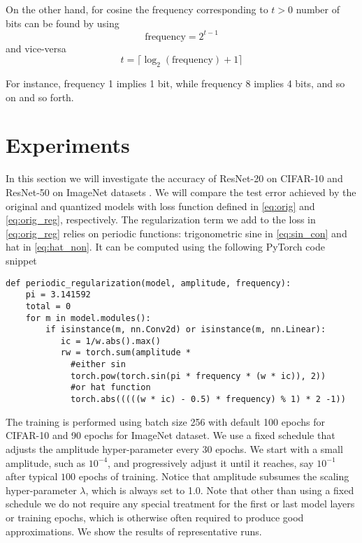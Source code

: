 \documentclass{article}
\begin{document}
On the other hand, for cosine the frequency corresponding to $t>0$ number of bits can be found by using
\begin{equation}
\text{frequency} =  2^{t-1}
\end{equation}
and vice-versa
\begin{equation}
t = \lceil \log_2 (\text{frequency}) + 1 \rceil
\end{equation}

For instance, frequency 1 implies 1 bit, while frequency 8 implies 4 bits, and so on and so forth.


\section{Experiments}

In this section we will investigate the accuracy of ResNet-20 on CIFAR-10 and ResNet-50 on ImageNet datasets \cite{ResNet,CIFAR,ImageNet}. We will compare the test error achieved by the original and quantized models with loss function defined in \eqref{eq:orig} and \eqref{eq:orig_reg}, respectively. The regularization term we add to the loss in \eqref{eq:orig_reg} relies on periodic functions: trigonometric sine in \eqref{eq:sin_con} and hat in \eqref{eq:hat_non}. It can be computed using the following PyTorch \cite{PyTorch} code snippet

\begin{verbatim}
def periodic_regularization(model, amplitude, frequency):
    pi = 3.141592
    total = 0
    for m in model.modules():
        if isinstance(m, nn.Conv2d) or isinstance(m, nn.Linear):
           ic = 1/w.abs().max()
           rw = torch.sum(amplitude *
             #either sin
             torch.pow(torch.sin(pi * frequency * (w * ic)), 2))
             #or hat function
             torch.abs(((((w * ic) - 0.5) * frequency) % 1) * 2 -1))
\end{verbatim}

The training is performed using batch size 256 with default 100 epochs for CIFAR-10 and 90 epochs for ImageNet dataset. We use a fixed schedule that adjusts the amplitude hyper-parameter every $30$ epochs. We start with a small amplitude, such as $10^{-4}$, and progressively adjust it until it reaches, say $10^{-1}$ after typical $100$ epochs of training. Notice that amplitude subsumes the scaling hyper-parameter $\lambda$, which is always set to 1.0. Note that other than using a fixed schedule we do not require any special treatment for the first or last model layers or training epochs, which is otherwise often required to produce good approximations. We show the results of representative  runs.
\end{document}
